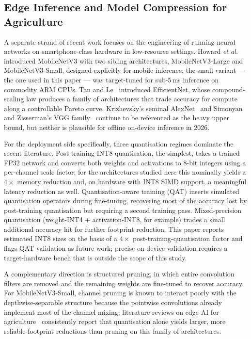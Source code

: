 \documentclass[conference,10pt]{IEEEtran}
\begin{document}
\subsection{Edge Inference and Model Compression for Agriculture}

A separate strand of recent work focuses on the engineering of running
neural networks on smartphone-class hardware in low-resource settings.
Howard \emph{et al.}~\cite{howard2019} introduced MobileNetV3 with two
sibling architectures, MobileNetV3-Large and MobileNetV3-Small, designed
explicitly for mobile inference; the small variant — the one used in this
paper — was target-tuned for sub-5\,ms inference on commodity ARM CPUs.
Tan and Le~\cite{tan2019} introduced EfficientNet, whose compound-scaling
law produces a family of architectures that trade accuracy for compute along
a controllable Pareto curve. Krizhevsky's seminal AlexNet~\cite{krizhevsky2012}
and Simonyan and Zisserman's VGG family~\cite{simonyan2015} continue to be
referenced as the heavy upper bound, but neither is plausible for offline
on-device inference in 2026.

For the deployment side specifically, three quantisation regimes dominate
the recent literature. Post-training INT8 quantisation, the simplest, takes a
trained FP32 network and converts both weights and activations to 8-bit
integers using a per-channel scale factor; for the architectures studied
here this nominally yields a $4\times$ memory reduction and, on hardware
with INT8 SIMD support, a meaningful latency reduction as well. Quantisation-aware
training (QAT) inserts simulated quantisation operators during fine-tuning,
recovering most of the accuracy lost by post-training quantisation but
requiring a second training pass. Mixed-precision quantisation
(weight-INT4 + activation-INT8, for example) trades a small additional
accuracy hit for further footprint reduction. This paper reports estimated
INT8 sizes on the basis of a $4\times$ post-training-quantisation factor and
flags QAT validation as future work; precise on-device validation requires a
target-hardware bench that is outside the scope of this study.

A complementary direction is structured pruning, in which entire convolution
filters are removed and the remaining weights are fine-tuned to recover
accuracy. For MobileNetV3-Small, channel pruning is known to interact poorly
with the depthwise-separable structure because the pointwise convolutions
already implement most of the channel mixing; literature reviews on
edge-AI for agriculture~\cite{edgeai2024} consistently report that
quantisation alone yields larger, more reliable footprint reductions than
pruning on this family of architectures.
\end{document}
